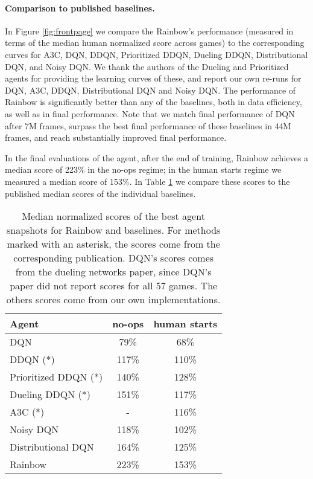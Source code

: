 \documentclass[letterpaper]{article} \usepackage{aaai18}  \usepackage{times}  \usepackage{helvet}  \usepackage{courier}  \usepackage{url}  \usepackage{graphicx}  \usepackage{amsmath,amssymb}
\begin{document}
\paragraph{Comparison to published baselines.}
In Figure \ref{fig:frontpage} we compare the Rainbow's performance (measured in terms of the median human normalized score across games) to the corresponding curves for A3C, DQN, DDQN, Prioritized DDQN, Dueling DDQN, Distributional DQN, and Noisy DQN. We thank the authors of the Dueling and Prioritized agents for providing the learning curves of these, and report our own re-runs for DQN, A3C, DDQN, Distributional DQN and Noisy DQN. The performance of Rainbow is significantly better than any of the baselines, both in data efficiency, as well as in final performance. Note that we match final performance of DQN after 7M frames, surpass the best final performance of these baselines in 44M frames, and reach substantially improved final performance.

In the final evaluations of the agent, after the end of training, Rainbow achieves a median score of 223\% in the no-ops regime; in the human starts regime we measured a median score of 153\%. In Table \ref{fig:end_of_training_scores} we compare these scores to the published median scores of the individual baselines.

\begin{table}[b!]
\vspace{-0.5em}
\centering
\begin{tabular}{ | l | c c |}
\hline
Agent           & no-ops &  human starts \\
\hline
\hline
 DQN              & 79\%           & 68\% \\
 DDQN (*)            & 117\%          & 110\% \\
 Prioritized DDQN (*)      & 140\%          & 128\% \\
 Dueling DDQN (*)          & 151\%          & 117\% \\
 A3C (*)              &   -     & 116\%     \\
 Noisy DQN          & 118\%           & 102\%   \\
 Distributional DQN   & 164\%          & 125\% \\
 \hline
 Rainbow          & 223\%          & 153\% \\
 \hline

\end{tabular}
\caption{Median normalized scores of the best agent snapshots for Rainbow and baselines.  For methods marked with an asterisk, the scores come from the corresponding publication. DQN's scores comes from the dueling networks paper, since DQN's paper did not report scores for all 57 games. The others scores come from our own implementations. 
}
\label{fig:end_of_training_scores}
\end{table}
\end{document}
